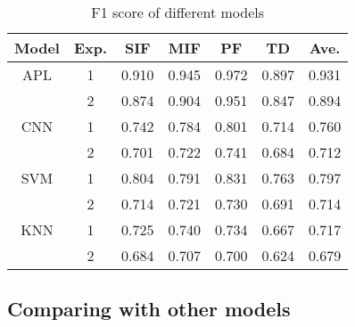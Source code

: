 \documentclass[conference]{IEEEtran}
\begin{document}
\begin{table}[htbp]

\caption{F1 score of different models}

\begin{center}

\begin{tabular}{ccccccc}

\hline

Model & Exp. & SIF & MIF & PF & TD & Ave. \\

\hline

APL & 1  & 0.910 & 0.945 & 0.972 & 0.897 & 0.931 \\

 & 2 & 0.874 & 0.904 & 0.951 & 0.847 & 0.894 \\

CNN & 1 & 0.742 & 0.784 & 0.801 & 0.714 & 0.760 \\

& 2 & 0.701 & 0.722 & 0.741 & 0.684 & 0.712 \\

SVM & 1 & 0.804 & 0.791 & 0.831 & 0.763 & 0.797 \\

& 2 & 0.714	& 0.721	& 0.730	& 0.691	& 0.714 \\

KNN & 1 & 0.725	&0.740	&0.734&	0.667&	0.717\\

& 2 & 0.684	&0.707	&0.700	&0.624&	0.679\\
\hline
\end{tabular}

\end{center}

\end{table}



\subsection{Comparing with other models}
\end{document}
